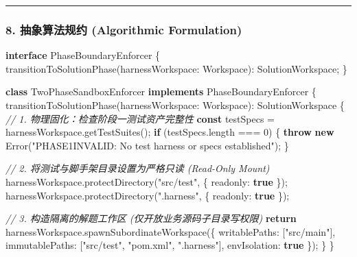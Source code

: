 \documentclass[
]{ctexart}
\newenvironment{Shaded}{}{}
\newcommand{\AttributeTok}[1]{\textcolor[rgb]{0.49,0.56,0.16}{#1}}
\newcommand{\BuiltInTok}[1]{\textcolor[rgb]{0.00,0.50,0.00}{#1}}
\newcommand{\CommentTok}[1]{\textcolor[rgb]{0.38,0.63,0.69}{\textit{#1}}}
\newcommand{\ControlFlowTok}[1]{\textcolor[rgb]{0.00,0.44,0.13}{\textbf{#1}}}
\newcommand{\DecValTok}[1]{\textcolor[rgb]{0.25,0.63,0.44}{#1}}
\newcommand{\FunctionTok}[1]{\textcolor[rgb]{0.02,0.16,0.49}{#1}}
\newcommand{\KeywordTok}[1]{\textcolor[rgb]{0.00,0.44,0.13}{\textbf{#1}}}
\newcommand{\NormalTok}[1]{#1}
\newcommand{\OperatorTok}[1]{\textcolor[rgb]{0.40,0.40,0.40}{#1}}
\newcommand{\StringTok}[1]{\textcolor[rgb]{0.25,0.44,0.63}{#1}}
\renewcommand{\_}{\discretionary{}{}{\textunderscore}}
\begin{document}
\begin{center}\rule{0.5\linewidth}{0.5pt}\end{center}

\subsubsection{8. 抽象算法规约 (Algorithmic
Formulation)}\label{ux62bdux8c61ux7b97ux6cd5ux89c4ux7ea6-algorithmic-formulation-2}

\begin{Shaded}
\begin{Highlighting}[]
\KeywordTok{interface}\NormalTok{ PhaseBoundaryEnforcer \{}
  \FunctionTok{transitionToSolutionPhase}\NormalTok{(harnessWorkspace}\OperatorTok{:}\NormalTok{ Workspace)}\OperatorTok{:}\NormalTok{ SolutionWorkspace}\OperatorTok{;}
\NormalTok{\}}

\KeywordTok{class}\NormalTok{ TwoPhaseSandboxEnforcer }\KeywordTok{implements}\NormalTok{ PhaseBoundaryEnforcer \{}
  \FunctionTok{transitionToSolutionPhase}\NormalTok{(harnessWorkspace}\OperatorTok{:}\NormalTok{ Workspace)}\OperatorTok{:}\NormalTok{ SolutionWorkspace \{}
    \CommentTok{// 1. 物理固化：检查阶段一测试资产完整性}
    \KeywordTok{const}\NormalTok{ testSpecs }\OperatorTok{=}\NormalTok{ harnessWorkspace}\OperatorTok{.}\FunctionTok{getTestSuites}\NormalTok{()}\OperatorTok{;}
    \ControlFlowTok{if}\NormalTok{ (testSpecs}\OperatorTok{.}\AttributeTok{length} \OperatorTok{===} \DecValTok{0}\NormalTok{) \{}
      \ControlFlowTok{throw} \KeywordTok{new} \BuiltInTok{Error}\NormalTok{(}\StringTok{"PHASE\_1\_INVALID: No test harness or specs established"}\NormalTok{)}\OperatorTok{;}
\NormalTok{    \}}

    \CommentTok{// 2. 将测试与脚手架目录设置为严格只读 (Read{-}Only Mount)}
\NormalTok{    harnessWorkspace}\OperatorTok{.}\FunctionTok{protectDirectory}\NormalTok{(}\StringTok{"src/test"}\OperatorTok{,}\NormalTok{ \{ readonly}\OperatorTok{:} \KeywordTok{true}\NormalTok{ \})}\OperatorTok{;}
\NormalTok{    harnessWorkspace}\OperatorTok{.}\FunctionTok{protectDirectory}\NormalTok{(}\StringTok{".harness"}\OperatorTok{,}\NormalTok{ \{ readonly}\OperatorTok{:} \KeywordTok{true}\NormalTok{ \})}\OperatorTok{;}

    \CommentTok{// 3. 构造隔离的解题工作区 (仅开放业务源码子目录写权限)}
    \ControlFlowTok{return}\NormalTok{ harnessWorkspace}\OperatorTok{.}\FunctionTok{spawnSubordinateWorkspace}\NormalTok{(\{}
\NormalTok{      writablePaths}\OperatorTok{:}\NormalTok{ [}\StringTok{"src/main"}\NormalTok{]}\OperatorTok{,}
\NormalTok{      immutablePaths}\OperatorTok{:}\NormalTok{ [}\StringTok{"src/test"}\OperatorTok{,} \StringTok{"pom.xml"}\OperatorTok{,} \StringTok{".harness"}\NormalTok{]}\OperatorTok{,}
\NormalTok{      envIsolation}\OperatorTok{:} \KeywordTok{true}
\NormalTok{    \})}\OperatorTok{;}
\NormalTok{  \}}
\NormalTok{\}}
\end{Highlighting}
\end{Shaded}
\end{document}

